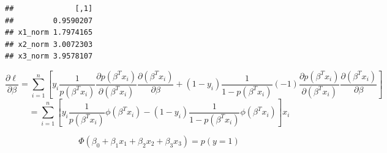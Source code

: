 \documentclass[]{book}
\newenvironment{Shaded}{\begin{snugshade}}{\end{snugshade}}
\newcommand{\NormalTok}[1]{#1}
\begin{document}
\begin{Shaded}
\begin{Highlighting}[]
{{{{\NormalTok{beta_old}
\end{Highlighting}
\end{Shaded}

\begin{verbatim}
##              [,1]
##         0.9590207
## x1_norm 1.7974165
## x2_norm 3.0072303
## x3_norm 3.9578107
\end{verbatim}

\[\frac{\partial \ell} {\partial \beta} = \sum_{i=1}^{n} [y_i \frac{1}{p(\beta ^T x_i)} \frac{\partial p(\beta ^T x_i)}{\partial (\beta ^T x_i)}\frac{\partial (\beta ^T x_i)}{\partial \beta}+(1-y_i) \frac{1}{1-p(\beta ^T x_i)}(-1)\frac{\partial p(\beta ^T x_i)}{\partial (\beta ^T x_i)}\frac{\partial (\beta ^T x_i)}{\partial \beta}] \]
\[=\sum_{i=1}^{n} [y_i \frac{1}{p(\beta ^T x_i)} \phi (\beta ^T x_i)-(1-y_i) \frac{1}{1-p(\beta ^T x_i)}\phi (\beta ^T x_i)]x_i\]

\[\Phi(\beta_0+\beta_1x_1+\beta_2x_2+\beta_3x_3)= p(y=1)\]
\end{document}
